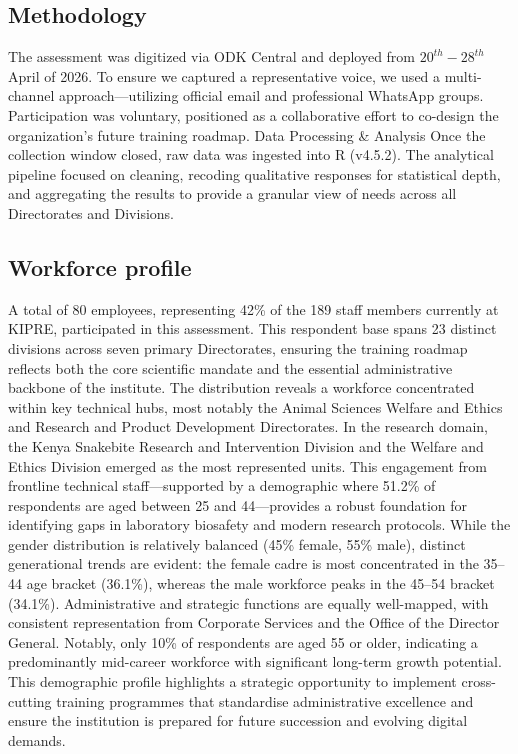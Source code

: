\documentclass[
]{article}
\begin{document}
\subsection{Methodology}\label{methodology}

The assessment was digitized via ODK Central and deployed from
\(20^{th}-28^{th}\) April of 2026. To ensure we captured a
representative voice, we used a multi-channel approach---utilizing
official email and professional WhatsApp groups. Participation was
voluntary, positioned as a collaborative effort to co-design the
organization's future training roadmap. Data Processing \& Analysis Once
the collection window closed, raw data was ingested into R (v4.5.2). The
analytical pipeline focused on cleaning, recoding qualitative responses
for statistical depth, and aggregating the results to provide a granular
view of needs across all Directorates and Divisions.

\subsection{Workforce profile}\label{workforce-profile}

A total of 80 employees, representing 42\% of the 189 staff members
currently at KIPRE, participated in this assessment. This respondent
base spans 23 distinct divisions across seven primary Directorates,
ensuring the training roadmap reflects both the core scientific mandate
and the essential administrative backbone of the institute. The
distribution reveals a workforce concentrated within key technical hubs,
most notably the Animal Sciences Welfare and Ethics and Research and
Product Development Directorates. In the research domain, the Kenya
Snakebite Research and Intervention Division and the Welfare and Ethics
Division emerged as the most represented units. This engagement from
frontline technical staff---supported by a demographic where 51.2\% of
respondents are aged between 25 and 44---provides a robust foundation
for identifying gaps in laboratory biosafety and modern research
protocols. While the gender distribution is relatively balanced (45\%
female, 55\% male), distinct generational trends are evident: the female
cadre is most concentrated in the 35--44 age bracket (36.1\%), whereas
the male workforce peaks in the 45--54 bracket (34.1\%). Administrative
and strategic functions are equally well-mapped, with consistent
representation from Corporate Services and the Office of the Director
General. Notably, only 10\% of respondents are aged 55 or older,
indicating a predominantly mid-career workforce with significant
long-term growth potential. This demographic profile highlights a
strategic opportunity to implement cross-cutting training programmes
that standardise administrative excellence and ensure the institution is
prepared for future succession and evolving digital demands.
\end{document}
